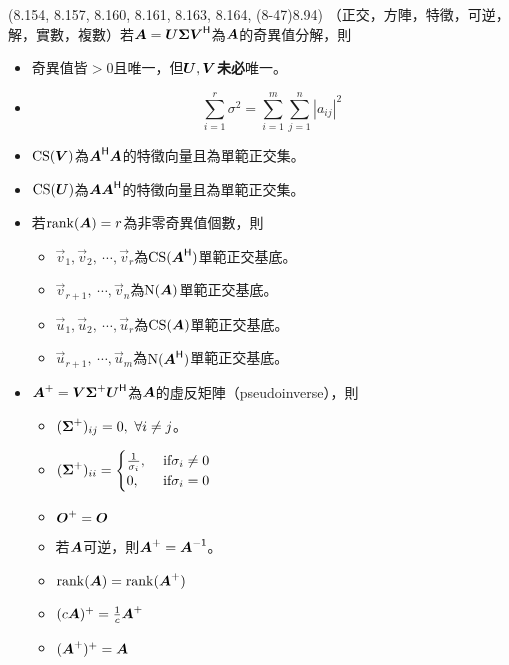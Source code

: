 \item \begin{theorem}{(8.154, 8.157, 8.160, 8.161, 8.163, 8.164, (8-47)8.94)} （正交，方陣，特徵，可逆，解，實數，複數）若$\boldsymbol{A} = \boldsymbol{U\Sigma V}^{\mathsf{H}}$為$\boldsymbol{A}$的奇異值分解，則
	\begin{itemize}
		\item 奇異值皆$> 0$且唯一，但$\boldsymbol{U}, \boldsymbol{V}$\textbf{未必}唯一。
		\item \begin{equation}
			\sum_{i = 1}^{r} \sigma^2 = \sum_{i = 1}^{m}\sum_{j = 1}^{n}|a_{ij}|^{2}
		\end{equation}
		\item $\operatorname{CS}(\boldsymbol{V})$為$\boldsymbol{A}^{\mathsf{H}}\boldsymbol{A}$的特徵向量且為單範正交集。
		\item $\operatorname{CS}(\boldsymbol{U})$為$\boldsymbol{A}\boldsymbol{A}^{\mathsf{H}}$的特徵向量且為單範正交集。
		\item 若$\operatorname{rank}(\boldsymbol{A}) = r$為非零奇異值個數，則
			\begin{itemize}
				\item $\vec{v}_1, \vec{v}_2, \ \cdots, \vec{v}_r$為$\operatorname{CS}(\boldsymbol{A}^{\mathsf{H}})$單範正交基底。
				\item $\vec{v}_{r + 1}, \ \cdots, \vec{v}_n$為$\operatorname{N}(\boldsymbol{A})$單範正交基底。
				\item $\vec{u}_1, \vec{u}_2, \ \cdots, \vec{u}_r$為$\operatorname{CS}(\boldsymbol{A})$單範正交基底。
				\item $\vec{u}_{r + 1}, \ \cdots, \vec{u}_m$為$\operatorname{N}(\boldsymbol{A}^{\mathsf{H}})$單範正交基底。 
			\end{itemize}
		\item $\boldsymbol{A}^+ = \boldsymbol{V}\boldsymbol{\Sigma}^+\boldsymbol{U}^{\mathsf{H}}$為$\boldsymbol{A}$的虛反矩陣（pseudoinverse），則
			\begin{itemize}
				\item $(\boldsymbol{\Sigma}^+)_{ij} = 0, \ \forall i \neq j$。
				\item $(\boldsymbol{\Sigma}^+)_{ii} = \begin{cases}
					\frac{1}{\sigma_i}, & \ \text{if} \sigma_i \neq 0 \\
					0, & \ \text{if} \sigma_i = 0
				\end{cases}$
				\item $\boldsymbol{O}^+ = \boldsymbol{O}$
				\item 若$\boldsymbol{A}$可逆，則$\boldsymbol{A}^+ = \boldsymbol{A}^{\mathsf{-1}}$。
				\item $\operatorname{rank}(\boldsymbol{A}) = \operatorname{rank}(\boldsymbol{A}^+)$
				\item $(c\boldsymbol{A})^+ = \frac{1}{c}\boldsymbol{A}^+$
				\item $(\boldsymbol{A}^+)^+ = \boldsymbol{A}$

\end{itemize}
\end{itemize}
\end{theorem}
